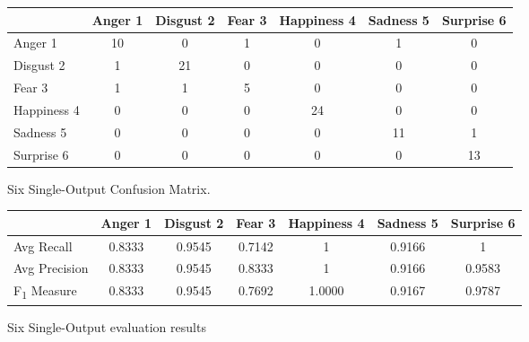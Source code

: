 \documentclass[a4paper,11pt]{article}
\begin{document}
\begin{figure}[h]                                                               
\begin{center}                                                                  
     \begin{tabular}{ | l || c | c | c | c | c | c | }                           
     \hline                                                                      
           & Anger 1 & Disgust 2 & Fear 3 & Happiness 4 & Sadness 5 & Surprise 6 \\ \hline \hline
         Anger 1 		& 10 & 0 & 1 & 0 & 1 & 0 \\ \hline                               
         Disgust 2 		& 1 & 21 & 0 & 0 & 0 & 0 \\ \hline                            
         Fear 3 		& 1 & 1 & 5 & 0 & 0 & 0 \\ \hline                                
         Happiness 4 	& 0 & 0 & 0 & 24 & 0 & 0 \\ \hline                          
         Sadness 5 		& 0 & 0 & 0 & 0 & 11 & 1 \\ \hline                             
         Surprise 6 	& 0 & 0 & 0 & 0 & 0 & 13 \\ \hline                           
     \end{tabular}                                                               
     \caption{Six Single-Output Confusion Matrix.}
     \label{fig:sixConfusionMatrix}                                                 
\end{center}                                                                    
\end{figure}

 \begin{figure}[h]                                                               
 \begin{center}                                                                  
 \begin{tabular}{ | l || c | c | c | c | c | c | }                               
     \hline                                                                      
           							& Anger 1 & Disgust 2 & Fear 3 & Happiness 4 & Sadness 5 & Surprise 6 \\ \hline \hline
         Avg Recall 				& 0.8333 & 0.9545 & 0.7142 & 1 & 0.9166 & 1 \\ \hline   
         Avg Precision 				& 0.8333 & 0.9545 & 0.8333 & 1 & 0.9166 & 0.9583 \\ \hline
         F\textsubscript{1} Measure & 0.8333 & 0.9545 & 0.7692 &  1.0000 &  0.9167 & 0.9787 \\ \hline
     \end{tabular}                                                               
     \caption{Six Single-Output evaluation results}                                                
     \label{fig:averageRecall}                                                   
 \end{center}                                                                    
 \end{figure} 
\end{document}

